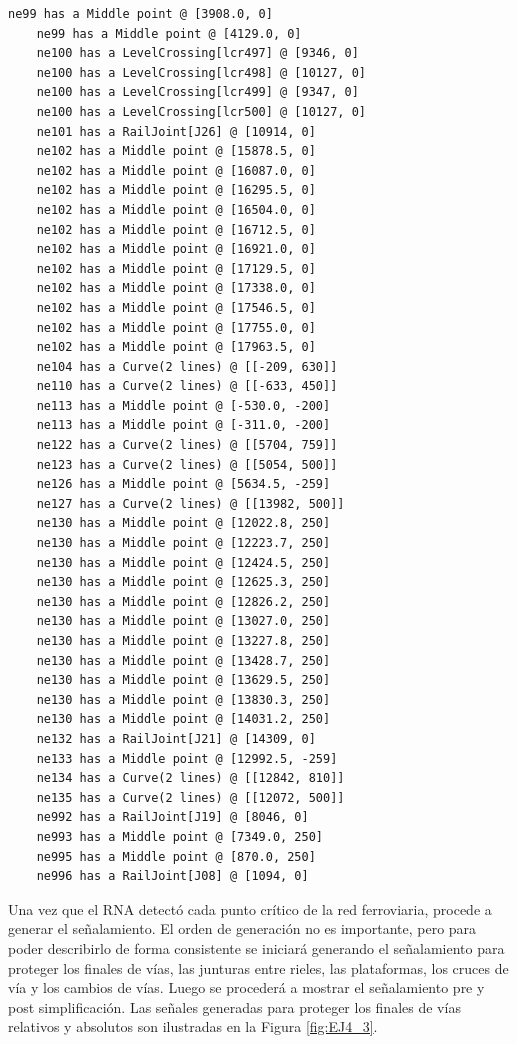 \begin{lstlisting}[language = {}, tabsize=4, basicstyle=\footnotesize\ttfamily, showspaces=false, showstringspaces=false, caption = Detección de puntos críticos por parte del RNA , label = {lst:EJ4_2}]
	ne99 has a Middle point @ [3908.0, 0]
	ne99 has a Middle point @ [4129.0, 0]
	ne100 has a LevelCrossing[lcr497] @ [9346, 0]
	ne100 has a LevelCrossing[lcr498] @ [10127, 0]
	ne100 has a LevelCrossing[lcr499] @ [9347, 0]
	ne100 has a LevelCrossing[lcr500] @ [10127, 0]
	ne101 has a RailJoint[J26] @ [10914, 0]
	ne102 has a Middle point @ [15878.5, 0]
	ne102 has a Middle point @ [16087.0, 0]
	ne102 has a Middle point @ [16295.5, 0]
	ne102 has a Middle point @ [16504.0, 0]
	ne102 has a Middle point @ [16712.5, 0]
	ne102 has a Middle point @ [16921.0, 0]
	ne102 has a Middle point @ [17129.5, 0]
	ne102 has a Middle point @ [17338.0, 0]
	ne102 has a Middle point @ [17546.5, 0]
	ne102 has a Middle point @ [17755.0, 0]
	ne102 has a Middle point @ [17963.5, 0]
	ne104 has a Curve(2 lines) @ [[-209, 630]]
	ne110 has a Curve(2 lines) @ [[-633, 450]]
	ne113 has a Middle point @ [-530.0, -200]
	ne113 has a Middle point @ [-311.0, -200]
	ne122 has a Curve(2 lines) @ [[5704, 759]]
	ne123 has a Curve(2 lines) @ [[5054, 500]]
	ne126 has a Middle point @ [5634.5, -259]
	ne127 has a Curve(2 lines) @ [[13982, 500]]
	ne130 has a Middle point @ [12022.8, 250]
	ne130 has a Middle point @ [12223.7, 250]
	ne130 has a Middle point @ [12424.5, 250]
	ne130 has a Middle point @ [12625.3, 250]
	ne130 has a Middle point @ [12826.2, 250]
	ne130 has a Middle point @ [13027.0, 250]
	ne130 has a Middle point @ [13227.8, 250]
	ne130 has a Middle point @ [13428.7, 250]
	ne130 has a Middle point @ [13629.5, 250]
	ne130 has a Middle point @ [13830.3, 250]
	ne130 has a Middle point @ [14031.2, 250]
	ne132 has a RailJoint[J21] @ [14309, 0]
	ne133 has a Middle point @ [12992.5, -259]
	ne134 has a Curve(2 lines) @ [[12842, 810]]
	ne135 has a Curve(2 lines) @ [[12072, 500]]
	ne992 has a RailJoint[J19] @ [8046, 0]
	ne993 has a Middle point @ [7349.0, 250]
	ne995 has a Middle point @ [870.0, 250]
	ne996 has a RailJoint[J08] @ [1094, 0]
\end{lstlisting}

Una vez que el RNA detectó cada punto crítico de la red ferroviaria, procede a generar el señalamiento. El orden de generación no es importante, pero para poder describirlo de forma consistente se iniciará generando el señalamiento para proteger los finales de vías, las junturas entre rieles, las plataformas, los cruces de vía y los cambios de vías. Luego se procederá a mostrar el señalamiento pre y post simplificación. Las señales generadas para proteger los finales de vías relativos y absolutos son ilustradas en la Figura \ref{fig:EJ4_3}.


